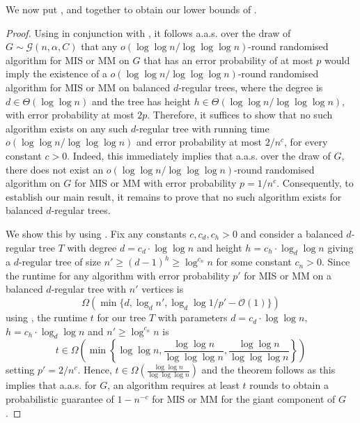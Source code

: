 \documentclass[letterpaper,11pt]{article}
\newcommand{\aas}{a.a.s.\xspace}
\newcommand{\1}{\mathbb I}
\newcommand{\hrg}{\mathcal{G}(n, \alpha, C)}
\newcommand{\bigO}{\mathcal{O}}
\begin{document}
%
We now put ,  and  together to obtain our lower bounds of .
%
\theoremlowerbound*
%
\begin{proof}
Using  in conjunction with , it follows \aas over the draw of $G\sim\hrg$ that any $o(\log\log n / \log\log\log n)$-round randomised algorithm for MIS or MM on $G$ that has an error probability of at most $p$ would imply the existence of a $o(\log\log n / \log\log\log n)$-round randomised algorithm for MIS or MM on balanced $d$-regular trees, where the degree is $d \in \Theta(\log\log n)$ and the tree has height $h\in \Theta(\log\log n / \log\log\log n)$, with error probability at most $2p$. Therefore, it suffices to show that no such algorithm exists on any such $d$-regular tree with running time $o(\log\log n / \log\log\log n)$ and error probability at most $2/n^{c}$, for every constant $c>0$. Indeed, this immediately implies that \aas over the draw of $G$, there does not exist an $o(\log\log n / \log\log\log n)$-round randomised algorithm on $G$ for MIS or MM with error probability $p = 1/n^{c}$. Consequently, to establish our main result, it remains to prove that no such algorithm exists for balanced $d$-regular trees.

We show this by using . Fix any constants $c, c_d, c_h > 0$ and consider a balanced $d$-regular tree $T$ with degree $d = c_d \cdot \log\log n$ and height $h = c_h \cdot \log_d\log n$ giving a $d$-regular tree of size $n' \geq (d-1)^{h} \geq \log^{c_n} n$ for some constant $c_n > 0$. Since the runtime for any algorithm with error probability $p'$ for MIS or MM on a balanced $d$-regular tree with $n'$ vertices is 
%
$$\Omega(\min\{d, \log_d n', \log_d \log {1/p'}-\bigO(1)\})$$
%
using , the runtime $t$ for our tree $T$ with parameters $d = c_d \cdot \log\log n$, $h = c_h \cdot \log_d\log n$ and $n' \geq \log^{c_n} n$ is 
%
$$t\in \Omega\left(\min\left\{\log\log n, \frac{\log\log n}{\log\log\log n},\frac{\log\log n}{\log\log\log n}\right\}\right)$$
%
setting $p'=2/n^c$. Hence, $t \in \Omega\left(\frac{\log\log n}{\log\log\log n}\right)$ and the theorem follows as this implies that \aas for $G$, an algorithm requires at least $t$ rounds to obtain a probabilistic guarantee of $1 - n^{-c}$ for MIS or MM for the giant component of $G$.
\end{proof}
%
\end{document}
